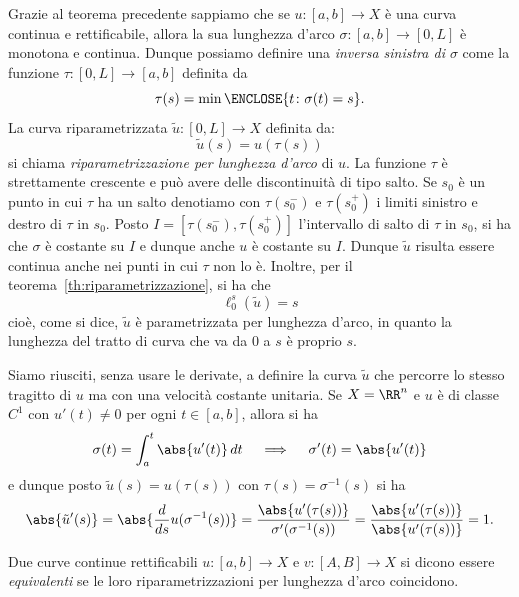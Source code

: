 Grazie al teorema precedente sappiamo che se $u\colon [a,b] \to X$ è una curva continua e rettificabile, 
allora la sua lunghezza d'arco $\sigma\colon[a,b] \to [0,L]$ è monotona e continua.
Dunque possiamo definire una \emph{inversa sinistra di $\sigma$} 
come la funzione $\tau\colon [0,L] \to [a,b]$ definita da
\[
  \tau(s) = \min \ENCLOSE{t\colon \sigma(t)=s}.
\]
La curva riparametrizzata $\tilde u\colon [0,L] \to X$ definita da:
\[
  \tilde u(s) = u(\tau(s))
\]
si chiama \emph{riparametrizzazione per lunghezza d'arco} di $u$.
La funzione $\tau$ è strettamente crescente e può avere delle discontinuità 
di tipo salto. Se $s_0$ è un punto in cui $\tau$ ha un salto denotiamo con 
$\tau(s_0^-)$ e $\tau(s_0^+)$ i limiti sinistro e destro di $\tau$ in $s_0$.
Posto $I = [\tau(s_0^-), \tau(s_0^+)]$ 
l'intervallo di salto di $\tau$ in $s_0$, 
si ha che $\sigma$ è costante su $I$ e dunque anche $u$ è costante su $I$.
Dunque $\tilde u$ risulta essere continua anche nei punti in cui $\tau$ non lo è.
Inoltre, per il teorema~\ref{th:riparametrizzazione}, si ha che 
\[
  \ell_0^s(\tilde u) = s
\]
cioè, come si dice, $\tilde u$ è parametrizzata per lunghezza d'arco, in quanto 
la lunghezza del tratto di curva che va da $0$ a $s$ è proprio $s$.

Siamo riusciti, senza usare le derivate, a definire la curva $\tilde u$ che percorre 
lo stesso tragitto di $u$ ma con una velocità costante unitaria. 
Se $X=\RR^n$ e $u$ è di classe $C^1$ con $u'(t)\neq 0$ per ogni $t\in[a,b]$,
allora si ha 
\[
  \sigma(t) = \int_a^t \abs{u'(t)}\, dt 
  \quad\implies\quad
  \sigma'(t) = \abs{u'(t)} 
\]
e dunque posto $\tilde u(s) = u(\tau(s))$ con $\tau(s) = \sigma^{-1}(s)$ si ha
\[
 \abs{\tilde u'(s)}
 = \abs{\frac{d}{ds} u(\sigma^{-1}(s))}
 = \frac{\abs{u'(\tau(s))}}{\sigma'(\sigma^{-1}(s))}
 = \frac{\abs{u'(\tau(s))}}{\abs{u'(\tau(s))}} = 1.
\]


\begin{definition}
Due curve continue rettificabili $u \colon [a,b] \to X$ e $v \colon [A,B] \to X$ 
si dicono essere \emph{equivalenti} se le loro riparametrizzazioni per 
lunghezza d'arco coincidono.
\end{definition}


